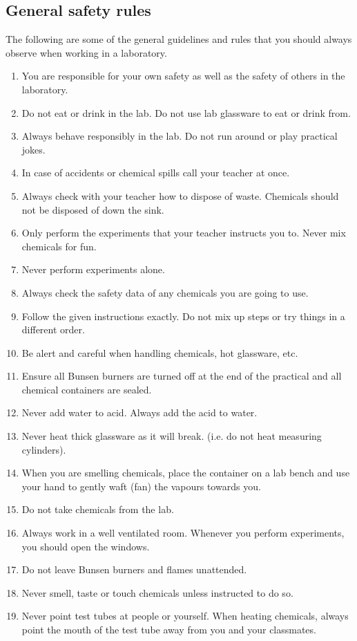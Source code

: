 \begin{enumerate}[label=\textbf{\arabic*}.]
\subsection*{General safety rules}
            \nopagebreak
The following are some of the general guidelines and rules that you should always observe when working in a laboratory.
\begin{enumerate}[noitemsep, label=\textbf{\arabic*}. ] 
\item You are responsible for your own safety as well as the safety of others in the laboratory.
\item Do not eat or drink in the lab. Do not use lab glassware to eat or drink from.
\item Always behave responsibly in the lab. Do not run around or play practical jokes.
\item In case of accidents or chemical spills call your teacher at once.
\item Always check with your teacher how to dispose of waste. Chemicals should not be disposed of down the sink.
\item Only perform the experiments that your teacher instructs you to. Never mix chemicals for fun.
\item Never perform experiments alone. 
\item Always check the safety data of any chemicals you are going to use. 
\item Follow the given instructions exactly. Do not mix up steps or try things in a different order.
\item Be alert and careful when handling chemicals, hot glassware, etc.  
\item Ensure all Bunsen burners are turned off at the end of the practical and all chemical containers are sealed.
\item Never add water to acid. Always add the acid to water.
\item Never heat thick glassware as it will break. (i.e. do not heat measuring cylinders).
\item When you are smelling chemicals, place the container on a lab bench and use your hand to gently waft (fan) the vapours towards you.
\item Do not take chemicals from the lab.
\item Always work in a well ventilated room. Whenever you perform experiments, you should open the windows.
\item Do not leave Bunsen burners and flames unattended. 
\item Never smell, taste or touch chemicals unless instructed to do so.
\item Never point test tubes at people or yourself. When heating chemicals, always point the mouth of the test tube away from you and your classmates.
\end{enumerate}
\par 

\end{enumerate}
